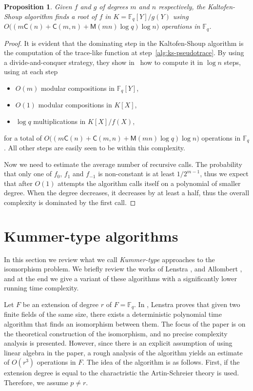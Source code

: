 \documentclass[12pt]{article}
\theoremstyle{plain}
\newtheorem{proposition}[theorem]{Proposition}
\theoremstyle{definition}
\def\F{\ensuremath{\mathbb{F}}}
\def\MM{\ensuremath{\mathsf{M}}}
\def\CC{\ensuremath{\mathsf{C}}}
\newcounter{algorithm}
\begin{document}
\begin{proposition}
  Given $f$ and $g$ of degrees $m$ and $n$ respectively, the
  Kaltofen-Shoup algorithm finds a root of $f$ in $K=\F_q[Y]/g(Y)$
  using $O\bigl((m\CC(n) + \CC(m,n) + \MM(mn)\log q)\log n\bigr)$
  operations in $\F_q$.
\end{proposition}
\begin{proof}
  It is evident that the dominating step in the Kaltofen-Shoup
  algorithm is the computation of the trace-like function at
  step~\ref{alg:ks-pseudotrace}. By using a divide-and-conquer
  strategy, they show in~\cite{kaltofen+shoup97} how to compute it in
  $\log n$ steps, using at each step
  \begin{itemize}
  \item $O(m)$ modular compositions in $\F_q[Y]$,
  \item $O(1)$ modular compositions in $K[X]$,
  \item $\log q$ multiplications in $K[X]/f(X)$,
  \end{itemize}
  for a total of $O\bigl((m\CC(n) + \CC(m,n) + \MM(mn)\log q)\log
  n\bigr)$ operations in $\F_q$.  All other steps are easily seen to
  be within this complexity.

  Now we need to estimate the average number of recursive calls. The
  probability that only one of $f_0$, $f_1$ and $f_{-1}$ is
  non-constant is at least $1/2^{m-1}$, thus we expect that after
  $O(1)$ attempts the algorithm calls itself on a polynomial of
  smaller degree. When the degree decreases, it decreases by at least
  a half, thus the overall complexity is dominated by the first call.
\end{proof}



\section{Kummer-type algorithms}
\label{sec:kummer}

In this section we review what we call \textit{Kummer-type} approaches to the isomorphism problem. 
We briefly review the works of Lenstra \cite{LenstraJr91}, and Allombert \cite{Allombert02}, and at 
the end we give a variant of these algorithms with a significantly lower running time complexity.

Let $F$ be an extension of degree $r$ of $F = \F_q$. In \cite{LenstraJr91}, Lenstra proves that 
given two finite fields of the same size, there exists a deterministic polynomial time algorithm 
that finds an isomorphism between them. The focus of the paper is on the theoretical construction 
of the isomorphism, and no precise complexity analysis is presented. However, since there is an 
explicit assumption of using linear algebra in the paper, a rough analysis of the algorithm yields 
an estimate of $O(r^3)$ operations in $F$. The idea of the algorithm is as follows. First, if 
the extension degree is equal to the charactristic the Artin-Schreier theory is used. Therefore, we 
assume $p \ne r$.
\end{document}
